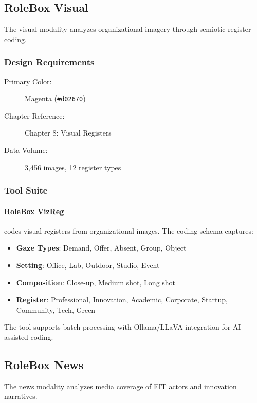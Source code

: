 \subsection{RoleBox Visual}

The visual modality analyzes organizational imagery through semiotic register coding.

\subsubsection{Design Requirements}

\begin{description}
    \item[Primary Color:] Magenta (\texttt{\#d02670})
    \item[Chapter Reference:] Chapter 8: Visual Registers
    \item[Data Volume:] 3,456 images, 12 register types
\end{description}

\subsubsection{Tool Suite}

\paragraph{RoleBox VizReg} codes visual registers from organizational images. The coding schema captures:

\begin{itemize}
    \item \textbf{Gaze Types}: Demand, Offer, Absent, Group, Object
    \item \textbf{Setting}: Office, Lab, Outdoor, Studio, Event
    \item \textbf{Composition}: Close-up, Medium shot, Long shot
    \item \textbf{Register}: Professional, Innovation, Academic, Corporate, Startup, Community, Tech, Green
\end{itemize}

The tool supports batch processing with Ollama/LLaVA integration for AI-assisted coding.

\subsection{RoleBox News}

The news modality analyzes media coverage of EIT actors and innovation narratives.

